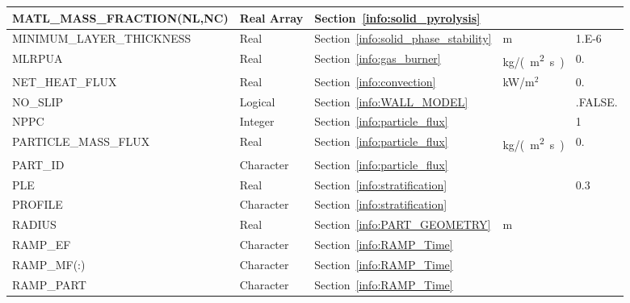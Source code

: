 \documentclass[11pt]{book}
\begin{document}
\begin{longtable}{@{\extracolsep{\fill}}|l|l|l|l|l|}
{\ct MATL\_MASS\_FRACTION(NL,NC)}     & Real Array      & Section~\ref{info:solid_pyrolysis}        &                     &                         \\ \hline
{\ct MINIMUM\_LAYER\_THICKNESS}       & Real            & Section~\ref{info:solid_phase_stability}  & m                   & 1.E-6                   \\ \hline
{\ct MLRPUA }                         & Real            & Section~\ref{info:gas_burner}             & \si{kg/(m^2.s)}     & 0.                      \\ \hline
{\ct NET\_HEAT\_FLUX}                 & Real            & Section~\ref{info:convection}             & kW/m$^2$            & 0.                      \\ \hline
{\ct NO\_SLIP}                        & Logical         & Section~\ref{info:WALL_MODEL}             &                     & {\ct .FALSE.}           \\ \hline
{\ct NPPC}                            & Integer         & Section~\ref{info:particle_flux}          &                     & 1                       \\ \hline
{\ct PARTICLE\_MASS\_FLUX}            & Real            & Section~\ref{info:particle_flux}          & \si{kg/(m^2.s)}     & 0.                      \\ \hline
{\ct PART\_ID}                        & Character       & Section~\ref{info:particle_flux}          &                     &                         \\ \hline
{\ct PLE}                             & Real            & Section~\ref{info:stratification}         &                     & 0.3                     \\ \hline
{\ct PROFILE}                         & Character       & Section~\ref{info:stratification}         &                     &                         \\ \hline
{\ct RADIUS}                          & Real            & Section~\ref{info:PART_GEOMETRY}          & m                   &                         \\ \hline
{\ct RAMP\_EF}                        & Character       & Section~\ref{info:RAMP_Time}              &                     &                         \\ \hline
{\ct RAMP\_MF(:)}                     & Character       & Section~\ref{info:RAMP_Time}              &                     &                         \\ \hline
{\ct RAMP\_PART}                      & Character       & Section~\ref{info:RAMP_Time}              &                     &                         \\ \hline

\end{longtable}
\end{document}
